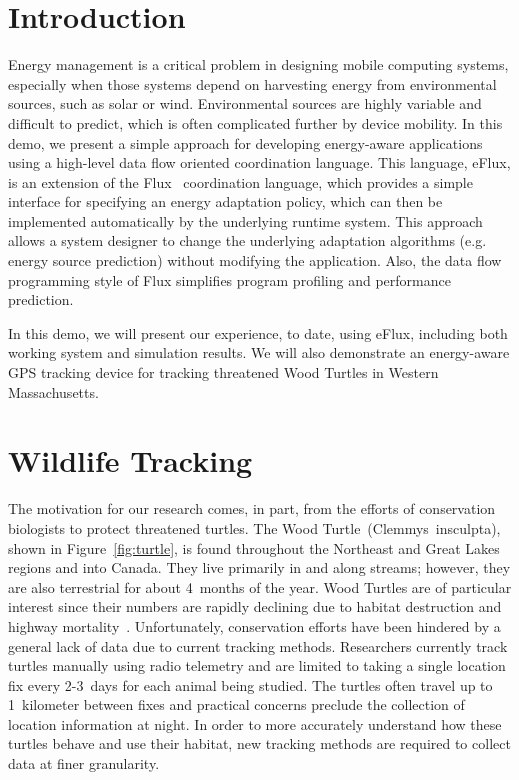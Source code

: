 \documentclass[letterpaper,times,twocolumn,10pt]{article}
\begin{document}
{\small
\section*{Introduction}

Energy management is a critical problem in designing mobile computing
systems, especially when those systems depend on harvesting energy
from environmental sources, such as solar or wind.  Environmental
sources are highly variable and difficult to predict, which is often
complicated further by device mobility.  In this demo, we present a
simple approach for developing energy-aware applications using a
high-level data flow oriented coordination language.  This language,
eFlux, is an extension of the Flux~\cite{flux} coordination language,
which provides a simple interface for specifying an energy adaptation
policy, which can then be implemented automatically by the underlying
runtime system.  This approach allows a system designer to change the
underlying adaptation algorithms (e.g. energy source prediction)
without modifying the application.  Also, the data flow programming
style of Flux simplifies program profiling and performance prediction.

In this demo, we will present our experience, to date, using eFlux,
including both working system and simulation results.  We will
also demonstrate an energy-aware GPS tracking device for tracking
threatened Wood Turtles in Western Massachusetts.  


\section*{Wildlife Tracking}



The motivation for our research comes, in part, from the efforts of
conservation biologists to protect threatened turtles.  The Wood
Turtle~(Clemmys~insculpta), shown in Figure~\ref{fig:turtle}, is found
throughout the Northeast and Great Lakes regions and into Canada.
They live primarily in and along streams; however, they are also
terrestrial for about 4~months of the year.  Wood Turtles are of
particular interest since their numbers are rapidly declining due to
habitat destruction and highway mortality~\cite{turtlesernst}.
Unfortunately, conservation efforts have been hindered by a general
lack of data due to current tracking methods.  Researchers currently
track turtles manually using radio telemetry and are limited to taking
a single location fix every 2-3~days for each animal being studied.
The turtles often travel up to 1~kilometer between fixes and practical
concerns preclude the collection of location information at night.  In
order to more accurately understand how these turtles behave and use
their habitat, new tracking methods are required to collect data at
finer granularity.  


}
\end{document}
